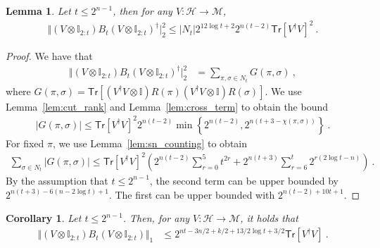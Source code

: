 \documentclass[11pt]{article}
\newtheorem{corollary}[theorem]{Corollary}
\newtheorem{lemma}[theorem]{Lemma}
\newcommand{\id}{\ensuremath{\mathbb{I}}}
\newcommand{\Tr}{\mathsf{Tr}}
\newcommand{\Hc}{\mathcal{H}}
\newcommand{\Mc}{\mathcal{M}}
\begin{document}
    \begin{lemma}\label{lem:2norm_st}
        Let $t \leq 2^{n-1}$, then for any $V:\Hc \rightarrow \Mc$,
        \begin{align}
            \Vert (V\otimes \id_{2:t}) B_t (V\otimes \id_{2:t})^\dagger \vert_2^2 \leq \vert N_t \vert 2^{12\log t+2} 2^{n(t-2)}\Tr[V^\dagger V]^2 \ .
        \end{align}
    \end{lemma}
    \begin{proof}
        We have that
        \begin{align}
            \Vert (V\otimes \id_{2:t}) B_t (V\otimes \id_{2:t})^\dagger \vert_2^2 & = \sum_{\pi,\sigma \in N_t} G(\pi,\sigma)\ ,
        \end{align}
        where $G(\pi,\sigma) = \Tr[(V^\dagger V\otimes \id) R(\pi) (V^\dagger V\otimes \id) R(\sigma)]$.
        We use Lemma~\ref{lem:cut_rank} and Lemma~\ref{lem:cross_term} to obtain the bound
        \begin{align}
            \vert G(\pi,\sigma)\vert \leq \Tr[V^\dagger V]^2  2^{n(t-2)}\min\left\{ 2^{n(t-2)}, 2^{n(t+3-\chi(\pi,\sigma))} \right\}\ .
        \end{align}
        For fixed $\pi$, we use Lemma~\ref{lem:sn_counting} to obtain
        \begin{align}
            \sum_{\sigma \in N_t} \vert G(\pi,\sigma)\vert \leq \Tr[V^\dagger V]^2 \left(2^{n(t-2)}\sum_{r=0}^5 t^{2r} + 2^{n(t+3)}\sum_{r=6}^t 2^{r(2\log t - n)}\right)\ .
        \end{align}
        By the assumption that $t \leq 2^{n-1}$, the second term can be upper bounded by $2^{n(t+3)-6(n-2\log t)+1}$. The first can be upper bounded with $2^{n(t-2)+10t+1}$. 
    \end{proof}
    \begin{corollary}\label{cor:1norm_st}
        Let $t \leq 2^{n-1}$. Then, for any $V:\Hc \rightarrow \Mc$, it holds that
        \begin{align}
            \Vert (V\otimes \id_{2:t}) B_t (V\otimes \id_{2:t})\Vert_1 & \leq 2^{nt-3n/2+k/2+13/2\log t+3/2}\Tr[V^\dagger V]\ .
        \end{align}
    \end{corollary}
\end{document}
